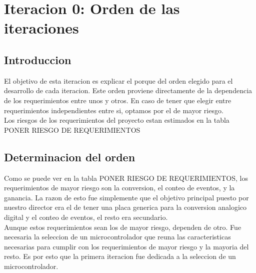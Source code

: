 \chapter{Iteracion 0: Orden de las iteraciones} %
\label{cha:iteracion_0}

\section{Introduccion} %
\label{sec:introduccion}

El objetivo de esta iteracion es explicar el porque del orden elegido para el desarrollo de cada iteracion. Este orden proviene directamente de la dependencia de los requerimientos entre unos y otros. En caso de tener que elegir entre requerimientos independientes entre si, optamos por el de mayor riesgo.  \\

Los riesgos de los requerimientos del proyecto estan estimados en la tabla PONER RIESGO DE REQUERIMIENTOS



\section{Determinacion del orden} %
\label{sec:determinacion_del_orden}

Como se puede ver en la tabla PONER RIESGO DE REQUERIMIENTOS, los requerimientos de mayor riesgo son la conversion, el conteo de eventos, y la ganancia. La razon de esto fue simplemente que el objetivo principal puesto por nuestro director era el de tener una placa generica para la conversion analogico digital y el conteo de eventos, el resto era secundario. \\

Aunque estos requerimientos sean los de mayor riesgo, dependen de otro. Fue necesaria la seleccion de un microcontrolador que reuna las caracteristicas necesarias para cumplir con los requerimientos de mayor riesgo y la mayoria del resto. Es por esto que la primera iteracion fue dedicada a la seleccion de un microcontrolador. \\

